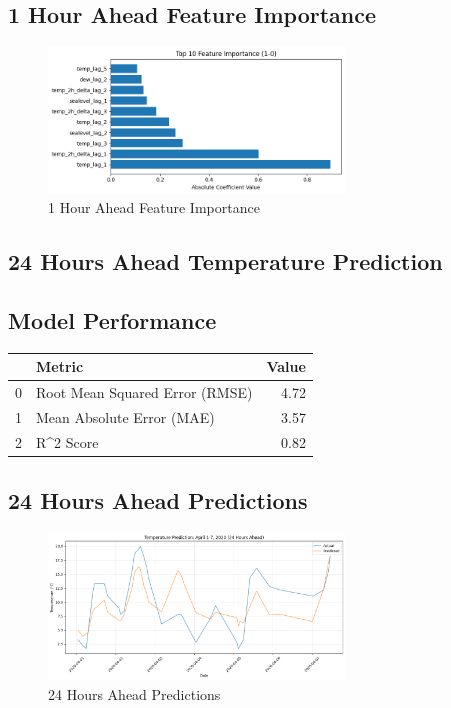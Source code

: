 \subsection{1 Hour Ahead Feature Importance}
\begin{figure}[htbp]
\centering
\includegraphics[width=0.7\textwidth]{1-0-linear_temp_shift_feature_importance.png}
\caption{1 Hour Ahead Feature Importance}
\label{fig:1_hour_ahead_featimp}
\end{figure}



\subsection{24 Hours Ahead Temperature Prediction}
\subsection{Model Performance}
\begin{tabular}{llr}
\toprule
 & Metric & Value \\
\midrule
0 & Root Mean Squared Error (RMSE) & 4.72 \\
1 & Mean Absolute Error (MAE) & 3.57 \\
2 & R^2 Score & 0.82 \\
\bottomrule
\end{tabular}

\subsection{24 Hours Ahead Predictions}
\begin{figure}[htbp]
\centering
\includegraphics[width=0.7\textwidth]{1-1-linear_temp_shift_results.png}
\caption{24 Hours Ahead Predictions}
\label{fig:24_hours_ahead_pred}
\end{figure}

